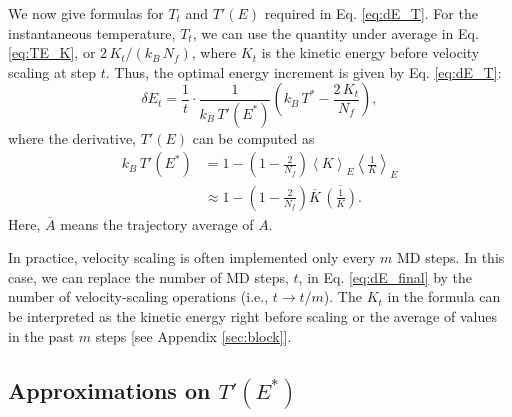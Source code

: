 \documentclass[reprint]{revtex4-1}
\begin{document}
We now give formulas for $T_t$
and $T'(E)$ required in Eq. \eqref{eq:dE_T}.
%
%
For the instantaneous temperature, $T_t$,
we can use the quantity under average in Eq. \eqref{eq:TE_K},
or $2 \, K_t/(k_B \, N_f)$,
where
$K_t$ is the kinetic energy before velocity scaling at step $t$.
%
Thus, the optimal energy increment is given by
Eq. \eqref{eq:dE_T}:
%
\begin{equation}
\delta E_t
=
\frac{ 1 } { t } \cdot
\frac{ 1 } { k_B \, T'(E^*) }
\left(
 k_B \, T^*
 -
 \frac{ 2 \, K_t } { N_f }
\right)
,
\label{eq:dE_final}
\end{equation}
%
where the derivative, $T'(E)$
can be computed as\cite{cagin1988}
%
\begin{align}
  k_B \, T'(E^*)
  &=
  1
  -
  \left(
    1 - \frac{2}{N_f}
  \right)
  \left\langle
  K
  \right\rangle_E
  \left\langle
    \frac 1 K
  \right\rangle_E
  \label{eq:dTdE}
  \\
  &\approx
  1
  -
  \left(
    1 - \frac{ 2 } { N_f }
  \right)
  \overline{ K }
  \,
  \overline{ \left( \frac 1 K \right) }
  .
  \label{eq:dT}
\end{align}
%
Here,
$\overline A$ means the trajectory average of $A$.

In practice, velocity scaling is often implemented
only every $m$ MD steps.
%
In this case,
we can replace the number of MD steps, $t$,
in Eq. \eqref{eq:dE_final} by
the number of velocity-scaling operations
(i.e., $t \to t/m$).
%
The $K_t$ in the formula can be interpreted as
the kinetic energy right before scaling
or the average of values in the past $m$ steps
[see Appendix \ref{sec:block}].




\subsection{\label{sec:gamma}
Approximations on $T'(E^*)$}
\end{document}
